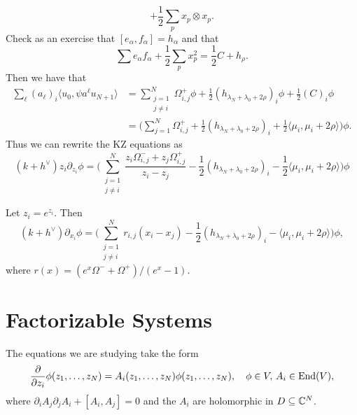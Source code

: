 \begin{remark}
\[    + \frac{1}{2} \sum_p x_p \otimes x_p.
  \]
  Check as an exercise that
  $[e_\alpha, f_\alpha] = h_\alpha$ and
  that
  \[
    \sum e_\alpha f_\alpha + \frac{1}{2} \sum_p x_p^2
    = \frac{1}{2} C + h_\rho.
  \]
  Then we have that
  \begin{align*}
    \sum_\ell (a_\ell)_i \langle u_0, \psi a^\ell u_{N + 1} \rangle
    &= \sum_{\substack{j = 1 \\ j \ne i}}^N \Omega_{i, j}^+ \phi
    + \frac{1}{2} (h_{\lambda_N + \lambda_0 + 2\rho})_i \phi
    + \frac{1}{2}(C)_i \phi \\
    &= \bigg(
      \sum_{j = 1}^N \Omega_{i, j}^+
      + \frac{1}{2}(h_{\lambda_N + \lambda_0 + 2\rho})_i
      + \frac{1}{2} \langle \mu_i, \mu_i + 2\rho \rangle
    \bigg) \phi.
  \end{align*}
  Thus we can rewrite the KZ equations as
  \[
    (k + h^\vee) z_i \partial_{z_i} \phi
    = \bigg(\sum_{\substack{j = 1 \\ j \ne i}}^N
    \frac{z_i \Omega_{i, j}^- + z_j \Omega_{i, j}^+}{z_i - z_j}
    - \frac{1}{2}(h_{\lambda_N + \lambda_0 + 2\rho})_i
    - \frac{1}{2}\langle \mu_i, \mu_i + 2\rho \rangle\bigg) \phi
  \]
\end{remark}

\begin{theorem}
  Let $z_i = e^{z_i}$. Then
  \[
    (k + h^\vee)
    \partial_{x_i} \phi
    = \bigg(
      \sum_{\substack{j = 1 \\ j \ne i}}^N
      r_{i, j}(x_i - x_j) -
      \frac{1}{2} (h_{\lambda_N + \lambda_0 + 2\rho})_i
      - \langle \mu_i, \mu_i + 2\rho \rangle
    \bigg) \phi,
  \]
  where $r(x) = (e^x \Omega^- + \Omega^+) / (e^x - 1)$.
\end{theorem}

\section{Factorizable Systems}
\begin{remark}
  The equations we are studying take the
  form
  \[
    \frac{\partial}{\partial z_i} \phi(z_1, \dots, z_N)
    = A_i(z_1, \dots, z_N) \phi(z_1, \dots, z_N), \quad \phi \in V,\, A_i \in \operatorname{End}(V),
  \]
  where $\partial_i A_j \partial_j A_i + [A_i, A_j] = 0$ and
  the $A_i$ are holomorphic in
  $D \subseteq \mathbb{C}^N$.
\end{remark}

